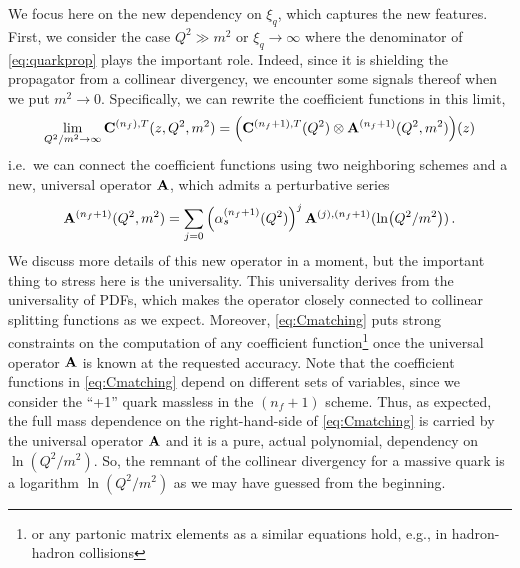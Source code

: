 We focus here on the new dependency on $\xi_q$, which captures the new features.
First, we consider the case $Q^2 \gg m^2$ or $\xi_q \to \infty$ where the denominator of \cref{eq:quarkprop} plays the important role.
Indeed, since it is shielding the propagator from a collinear divergency, we encounter some signals thereof when we put $m^2 \to 0$.
Specifically, we can rewrite the coefficient functions in this limit,
\begin{equation}
    \lim_{Q^2/m^2\to\infty}\vb C^{(n_f),T}(z,Q^2,m^2) = \qty(\vb C^{(n_f+1),T}(Q^2) \otimes \vb A^{(n_f+1)}(Q^2,m^2))(z) \label{eq:Cmatching}
\end{equation}
i.e.\ we can connect the coefficient functions using two neighboring schemes and a new, universal operator $\vb A$, which admits a perturbative series
\begin{equation}
    \vb A^{(n_f+1)}(Q^2,m^2) = \sum_{j=0} \left(\alpha_s^{(n_f+1)}(Q^2)\right)^j \vb A^{(j),(n_f+1)}(\ln(Q^2/m^2))\,.
\end{equation}
We discuss more details of this new operator in a moment, but the important thing to stress here is the universality.
This universality derives from the universality of PDFs, which makes the operator closely connected to collinear splitting functions as we expect.
Moreover, \cref{eq:Cmatching} puts strong constraints on the computation of any coefficient function\footnote{or any partonic matrix elements as a similar equations hold, e.g., in hadron-hadron collisions} once the universal operator $\vb A$ is known at the requested accuracy.
Note that the coefficient functions in \cref{eq:Cmatching} depend on different sets of variables, since we consider the \enquote{+1} quark massless in the $(n_f+1)$ scheme.
Thus, as expected, the full mass dependence on the right-hand-side of \cref{eq:Cmatching} is carried by the universal operator $\vb A$ and it is a pure, actual polynomial, dependency on $\ln(Q^2/m^2)$.
So, the remnant of the collinear divergency for a massive quark is a logarithm $\ln(Q^2/m^2)$ as we may have guessed from the beginning.

